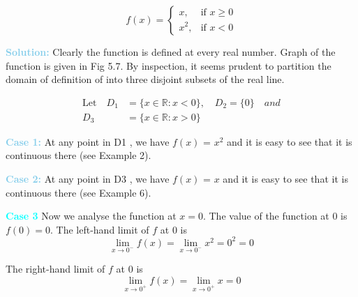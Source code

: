 \documentclass[a4paper,12pt]{article}
\begin{document}
\noindent \[
\hspace{0cm}
f(x) = \begin{cases} 
    x, & \text{if } x \geq 0 \\
    x^2, & \text{if } x < 0
\end{cases}
\]

\noindent \textbf{\textcolor{skyblue}{Solution:}} Clearly the function is defined at every real number. Graph of the function is given in Fig 5.7. By inspection, it seems prudent to partition the domain of definition of  into three disjoint subsets of the real line.
\vspace{-6pt}

\[
\begin{aligned}
    \text{Let} \quad D_1 &= \{x \in \mathbb{R} : x < 0\}, \quad D_2 = \{0\} \quad and \\
    D_3 &= \{x \in \mathbb{R} : x > 0\}
\end{aligned}
\]

\noindent \textbf{\textcolor{skyblue}{Case 1:}} At any point in D1
 , we have $f(x)$ = $x^2$ and it is easy to see that it is continuous
 there (see Example 2).  \hfill

\noindent \textbf{\textcolor{skyblue}{Case 2:}} At any point in D3
 , we have $f(x)$ = $x$ and it is easy to see that it is continuous
 there (see Example 6). \hfill

\noindent \textbf{\textcolor{cyan}{Case 3}} Now we analyse the function at \( x = 0 \). The value of the function at 0 is \( f(0) = 0 \). The left-hand limit of \( f \) at \( 0 \) is
\[
\lim_{x \to 0^-} f(x) = \lim_{x \to 0^-} x^2 = 0^2 = 0
\]

The right-hand limit of \( f \) at \( 0 \) is
\[
\lim_{x \to 0^+} f(x) = \lim_{x \to 0^+} x = 0
\]
\end{document}
